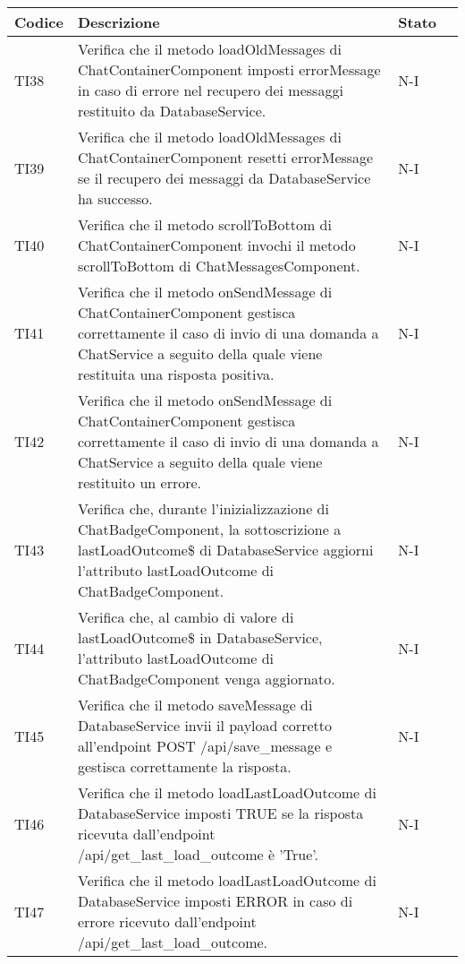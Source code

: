 \begin{table}[h!]
    \centering
    \renewcommand{\arraystretch}{1.5}
    \begin{tabularx}{\textwidth}{|p{}|X|p{}|p{}|}\hline
    \rowcolor[HTML]{FFD700}
    \textbf{Codice} & \textbf{Descrizione} & \textbf{Stato} \\ \hline
    TI38 & Verifica che il metodo loadOldMessages di ChatContainerComponent imposti errorMessage in caso di errore nel recupero dei messaggi restituito da DatabaseService. &  N-I \\ \hline
    TI39 & Verifica che il metodo loadOldMessages di ChatContainerComponent resetti errorMessage se il recupero dei messaggi da DatabaseService ha successo. &  N-I \\ \hline
    TI40 & Verifica che il metodo scrollToBottom di ChatContainerComponent invochi il metodo scrollToBottom di ChatMessagesComponent. &  N-I \\ \hline
    TI41 & Verifica che il metodo onSendMessage di ChatContainerComponent gestisca correttamente il caso di invio di una domanda a ChatService a seguito della quale viene restituita una risposta positiva. &  N-I \\ \hline
    TI42 & Verifica che il metodo onSendMessage di ChatContainerComponent gestisca correttamente il caso di invio di una domanda a ChatService a seguito della quale viene restituito un errore. &  N-I \\ \hline
    TI43 & Verifica che, durante l'inizializzazione di ChatBadgeComponent, la sottoscrizione a lastLoadOutcome\$ di DatabaseService aggiorni l'attributo lastLoadOutcome di ChatBadgeComponent. &  N-I \\ \hline
    TI44 & Verifica che, al cambio di valore di lastLoadOutcome\$ in DatabaseService, l'attributo lastLoadOutcome di ChatBadgeComponent venga aggiornato. &  N-I \\ \hline
    TI45 & Verifica che il metodo saveMessage di DatabaseService invii il payload corretto all’endpoint POST /api/save\_message e gestisca correttamente la risposta. &  N-I \\ \hline
    TI46 & Verifica che il metodo loadLastLoadOutcome di DatabaseService imposti TRUE se la risposta ricevuta dall'endpoint /api/get\_last\_load\_outcome è 'True'. &  N-I \\ \hline
    TI47 & Verifica che il metodo loadLastLoadOutcome di DatabaseService imposti ERROR in caso di errore ricevuto dall'endpoint /api/get\_last\_load\_outcome. &  N-I \\ \hline

\end{tabularx}
\end{table}
